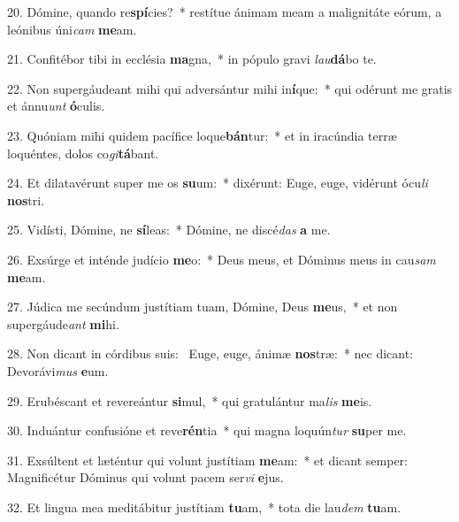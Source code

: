 20. Dómine, quando re\textbf{spí}cies?~*  restítue ánimam meam a malignitáte eórum, a leónibus úni\textit{cam} \textbf{me}am.\

21. Confitébor tibi in ecclésia \textbf{ma}gna,~*  in pópulo gravi \textit{lau}\textbf{dá}bo te.\

22. Non supergáudeant mihi qui adversántur mihi in\textbf{í}que:~*  qui odérunt me gratis et ánnu\textit{unt} \textbf{ó}culis.\

23. Quóniam mihi quidem pacífice loque\textbf{bán}tur:~*  et in iracúndia terræ loquéntes, dolos co\textit{gi}\textbf{tá}bant.\

24. Et dilatavérunt super me os \textbf{su}um:~*  dixérunt: Euge, euge, vidérunt ócu\textit{li} \textbf{nos}tri.\

25. Vidísti, Dómine, ne \textbf{sí}leas:~*  Dómine, ne discé\textit{das} \textbf{a} me.\

26. Exsúrge et inténde judício \textbf{me}o:~*  Deus meus, et Dóminus meus in cau\textit{sam} \textbf{me}am.\

27. Júdica me secúndum justítiam tuam, Dómine, Deus \textbf{me}us,~*  et non supergáude\textit{ant} \textbf{mi}hi.\

28. Non dicant in córdibus suis: \dag\  Euge, euge, ánimæ \textbf{nos}træ:~*  nec dicant: Devorávi\textit{mus} \textbf{e}um.\

29. Erubéscant et revereántur \textbf{si}mul,~*  qui gratulántur ma\textit{lis} \textbf{me}is.\

30. Induántur confusióne et reve\textbf{rén}tia~*  qui magna loquún\textit{tur} \textbf{su}per me.\

31. Exsúltent et læténtur qui volunt justítiam \textbf{me}am:~*  et dicant semper: Magnificétur Dóminus qui volunt pacem ser\textit{vi} \textbf{e}jus.\

32. Et lingua mea meditábitur justítiam \textbf{tu}am,~*  tota die lau\textit{dem} \textbf{tu}am.\

